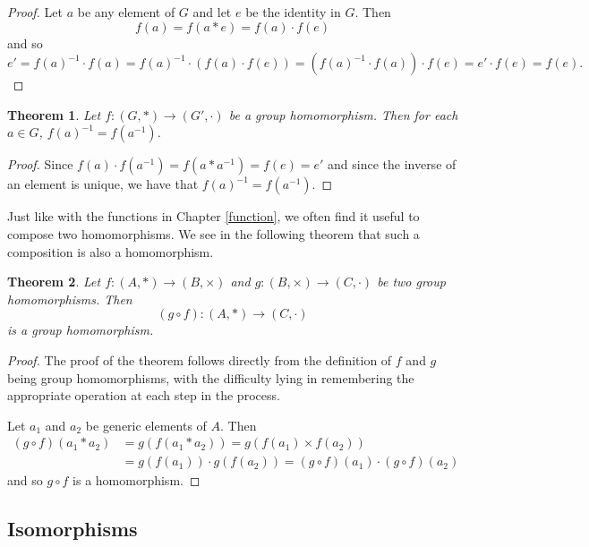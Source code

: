 \documentclass[
]{book}
\newtheorem{theorem}{Theorem}[chapter]
\theoremstyle{definition}
\theoremstyle{definition}
\theoremstyle{definition}
\theoremstyle{definition}
\theoremstyle{remark}
\begin{document}
\begin{proof}
Let \(a\) be any element of \(G\) and let \(e\) be the identity in \(G\). Then
\[f(a) = f(a*e) = f(a) \cdot f(e)\] and so \[e' = f(a)^{-1}\cdot f(a) = f(a)^{-1}\cdot ( f(a) \cdot f(e) ) = (f(a)^{-1} \cdot f(a))\cdot f(e) = e' \cdot f(e) = f(e).\]
\end{proof}

\begin{theorem}
\protect\hypertarget{thm:homomorphism-inverse}{}\label{thm:homomorphism-inverse}Let \(f:(G,*)\rightarrow (G',\cdot)\) be a group homomorphism. Then for each \(a\in G\), \(f(a)^{-1} = f\left(a^{-1}\right)\).
\end{theorem}

\begin{proof}
Since \(f(a) \cdot f\left(a^{-1}\right) = f\left(a*a^{-1}\right) = f(e) = e'\) and since the inverse of an element is unique, we have that \(f(a)^{-1} = f\left(a^{-1}\right)\).
\end{proof}

Just like with the functions in Chapter \ref{function}, we often find it useful to compose two homomorphisms. We see in the following theorem that such a composition is also a homomorphism.

\begin{theorem}
\protect\hypertarget{thm:homomorphism-composition}{}\label{thm:homomorphism-composition}Let \(f: (A,*) \rightarrow (B,\times)\) and \(g:(B,\times) \rightarrow (C,\cdot)\) be two group homomorphisms. Then \[(g\circ f): (A,*) \rightarrow (C,\cdot)\] is a group homomorphism.
\end{theorem}

\begin{proof}
The proof of the theorem follows directly from the definition of \(f\) and \(g\) being group homomorphisms, with the difficulty lying in remembering the appropriate operation at each step in the process.

Let \(a_1\) and \(a_2\) be generic elements of \(A\). Then
\begin{align*}
(g\circ f)(a_1 * a_2) &= g \left( f(a_1*a_2)\right) = g\left( f(a_1)\times f(a_2)\right) \\
&= g(f(a_1)) \cdot g(f(a_2)) = (g\circ f)(a_1) \cdot (g\circ f)(a_2)
\end{align*}
and so \(g\circ f\) is a homomorphism.
\end{proof}

\hypertarget{isomorphisms}{%
\subsection{Isomorphisms}\label{isomorphisms}}
\end{document}
